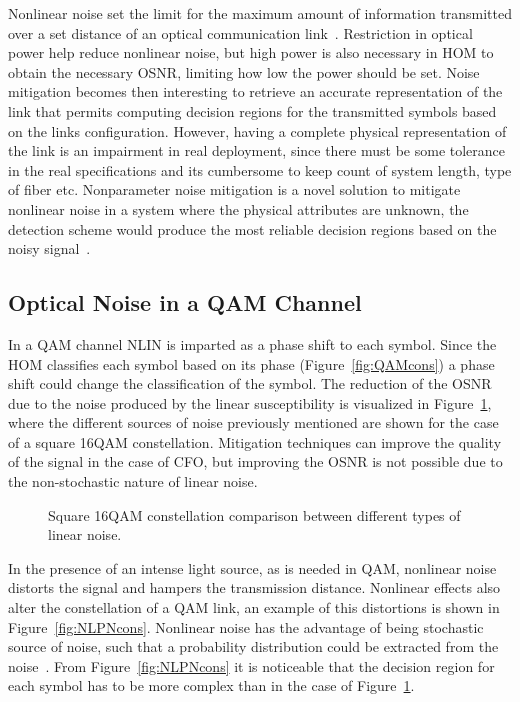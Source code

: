 Nonlinear noise set the limit for the maximum amount of information transmitted over a set distance of  an optical communication link~\cite{PrincBorn}. Restriction in optical power help reduce nonlinear noise, but high power is also necessary in HOM to obtain the necessary OSNR, limiting how low the power should be set. Noise mitigation becomes then interesting to retrieve an accurate representation of the link that permits computing decision regions for the transmitted symbols based on the links configuration. However, having a complete physical representation of the link is an impairment in real deployment, since there must be some tolerance in the real specifications and its cumbersome to keep count of system length, type of fiber etc. Nonparameter noise mitigation is a novel solution to mitigate nonlinear noise in a system where the physical attributes are unknown, the detection scheme would produce the most reliable decision regions based on the noisy signal~\cite{NLPNmPSK}.  
          

 
 
 \subsection{Optical Noise in a QAM Channel}

In a QAM channel NLIN is imparted as a phase shift to each symbol. Since the HOM classifies each symbol based on its phase (Figure~\ref{fig:QAMcons}) a phase shift could change the classification of the symbol.
The reduction of the OSNR due to the noise produced by the linear susceptibility is visualized  in Figure~\ref{fig:LinerNoise}, where the different sources of noise previously mentioned are shown for the case of a square 16QAM constellation. Mitigation techniques can improve the quality of the signal in the case of CFO, but improving the OSNR is not possible due to the non-stochastic nature of linear noise. 


  \begin{figure}[h!]
 \centering
 \caption{Square 16QAM constellation comparison between different types of linear noise. }
 \label{fig:LinerNoise}
\end{figure}
 In the presence of an intense light source, as is needed in QAM, nonlinear noise distorts the signal and hampers the transmission distance. Nonlinear effects also alter the constellation of a QAM link, an example of this distortions is shown in Figure~\ref{fig:NLPNcons}.  Nonlinear noise has the advantage of being stochastic source of noise, such that a probability distribution could be extracted from the noise~\cite{Zibar:12}. From Figure~\ref{fig:NLPNcons} it is noticeable that the decision region for each symbol has to be more complex than in the case of Figure~\ref{fig:LinerNoise}. 


